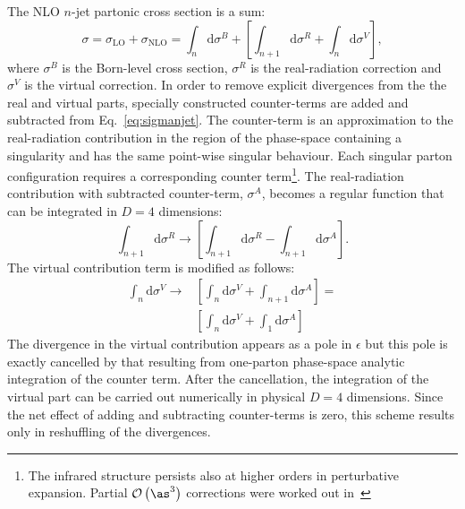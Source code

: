 The NLO $n$-jet partonic cross section is a sum:
\begin{equation}
\sigma = \sigma_\text{LO} + \sigma_\text{NLO} = \int_n{\mathrm{d}\sigma^B} + \left[ \int_{n+1}{\mathrm{d}\sigma^R} + \int_n{\mathrm{d}\sigma^V} \right],
\label{eq:sigmanjet}
\end{equation}
where $\sigma^B$ is the Born-level cross section, $\sigma^R$ is the real-radiation correction and $\sigma^V$ is the virtual correction. In order to remove explicit divergences from the the real and virtual parts, specially constructed counter-terms are added and subtracted from Eq.~\eqref{eq:sigmanjet}. The counter-term is an approximation to the real-radiation contribution in the region of the phase-space containing a singularity and has the same point-wise singular behaviour. Each singular parton configuration requires a corresponding counter term\footnote{The infrared structure persists also at higher orders in perturbative expansion. Partial $\mathcal{O}\left(\as^3\right)$ corrections were worked out in~\cite{Ridder:2013mf}}. The real-radiation contribution with subtracted counter-term, $\sigma^A$, becomes a regular function that can be integrated in $D=4$ dimensions:
\begin{equation}
\int_{n+1}{\mathrm{d}\sigma^R} \rightarrow \left[ \int_{n+1}{\mathrm{d}\sigma^R} - \int_{n+1}{\mathrm{d}\sigma^A} \right].
\end{equation}
The virtual contribution term is modified as follows:
\begin{equation}
	\begin{split}
		\int_{n}{\mathrm{d}\sigma^V} \rightarrow& \left[ \int_{n}{\mathrm{d}\sigma^V} + \int_{n+1}{\mathrm{d}\sigma^A} \right] = \\
                                                      & \left[ \int_{n}{\mathrm{d}\sigma^V + \int_{1}{\mathrm{d}\sigma^A}} \right]
	\end{split}
\end{equation}
The divergence in the virtual contribution appears as a pole in $\epsilon$ but this pole is exactly cancelled by that resulting from one-parton phase-space analytic integration of the counter term. After the cancellation, the integration of the virtual part can be carried out numerically in physical $D=4$ dimensions. Since the net effect of adding and subtracting counter-terms is zero, this scheme results only in reshuffling of the divergences.
